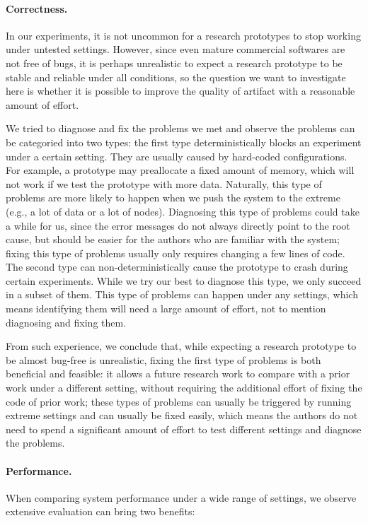 \vspace{-.1in}
\paragraph{Correctness.} In our experiments, it is not uncommon for a
research prototypes to stop working under untested settings. However, since even
mature commercial softwares are not free of bugs, it is perhaps unrealistic
to expect a research prototype to be stable and reliable under all conditions,
so the question we want to investigate here is whether it is possible to improve
the quality of artifact with a reasonable amount of effort.

We tried to diagnose and fix the problems we met and observe the problems can
be categoried into two types: the first type deterministically blocks an experiment
under a certain setting. They are usually caused by hard-coded configurations.
For example, a prototype may preallocate a fixed amount of memory, which will
not work if we test the prototype with more data. Naturally, this type of problems
are more likely to happen when we push the system to the extreme (e.g., a lot of
data or a lot of nodes). Diagnosing this type of problems could take a while for
us, since the error messages do not always directly point to the root cause, but should be
easier for the authors who are familiar with the system; fixing this type of problems
usually only requires changing a few lines of code. The second type can non-deterministically
cause the prototype to crash during certain experiments. While we try our best to
diagnose this type, we only succeed in a subset of them. This type of problems
can happen under any settings, which means identifying them will need a large
amount of effort, not to mention diagnosing and fixing them.

From such experience, we conclude that, while expecting a research prototype
to be almost bug-free is unrealistic, fixing the first type of problems is both
beneficial and feasible: it allows a future research work to compare with a prior
work under a different setting, without requiring the additional effort of
fixing the code of prior work; these types of problems can usually be triggered
by running extreme settings and can usually be fixed easily, which means the
authors do not need to spend a significant amount of effort to test different
settings and diagnose the problems.

\vspace{-.1in}
\paragraph{Performance.}
When comparing system performance under a wide range of settings,
we observe extensive evaluation can bring two benefits:

